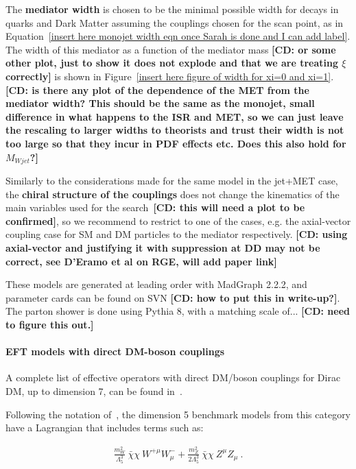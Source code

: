 The \textbf{mediator width} is chosen to be the minimal possible width
for decays in quarks and Dark Matter assuming the couplings chosen
for the scan point, as in Equation~\ref{insert here monojet width eqn once Sarah is done and I can add label}. 
The width of this mediator as a function of the mediator mass 
\textbf{[CD: or some other plot, just to show it does not explode 
and that we are treating $\xi$ correctly]} is shown in Figure~\ref{insert here
figure of width for xi=0 and xi=1}. \textbf{[CD: is there any plot
of the dependence of the MET from the mediator width? This should be the same as the 
monojet, small difference in what happens to the ISR and MET, so we can just leave
the rescaling to larger widths to theorists and trust their width is not too large
so that they incur in PDF effects etc. Does this also hold for $M_{Wjet}$?]}

Similarly to the considerations made for the same model in the jet+MET case, 
the \textbf{chiral structure of the couplings}
does not change the kinematics of the main variables used for the 
search~\textbf{[CD: this will need a plot to be confirmed]}, 
so we recommend to restrict to one of the cases, e.g. the axial-vector coupling case for
SM and DM particles to the mediator respectively. 
\textbf{[CD: using axial-vector and justifying it with suppression at DD may not be
correct, see D'Eramo et al on RGE, will add paper link]}

These models are generated at leading order with MadGraph 2.2.2, and parameter
cards can be found on SVN \textbf{[CD: how to put this in write-up?]}.
The parton shower is done using Pythia 8, with a matching scale of... 
\textbf{[CD: need to figure this out.]}

\paragraph{EFT models with direct DM-boson couplings}

A complete list of effective operators with direct DM/boson couplings for
Dirac DM, up to dimension 7, can be found in~\citep{Cotta:2012nj}. 

Following the notation of~\citep{Carpenter:2012rg}, the dimension 5 benchmark models 
from this category have a Lagrangian that includes terms such as:

\begin{eqnarray}
\frac{m_W^2}{\Lambda_5^3} ~\bar{\chi} \chi ~W^{+ \mu} W^{-}_\mu
+ \frac{m_Z^2}{2 \Lambda_5^3} ~ \bar{\chi} \chi ~ Z^\mu Z_\mu ~.
\end{eqnarray}
 
